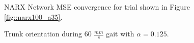 			\begin{figure}
				\centering
				\caption{NARX Network MSE convergence for trial shown in Figure \ref{fig::narx100_a35}.} 
				\label{fig::narx100_a35_nne}
			\end{figure}
			\begin{figure}
				\centering
				\caption{Trunk orientation during 60 $\frac{mm}{s}$ gait with $\alpha = 0.125$.}
				\label{fig::narx60_a125_nne}
			\end{figure}

